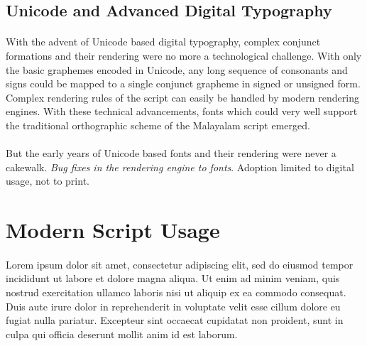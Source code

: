 \documentclass[10pt]{article}
\begin{document}
\subsection{Unicode and Advanced Digital Typography}

\paragraph{}
With the advent of Unicode based digital typography, complex conjunct formations and their rendering were no more a technological challenge. With only the basic graphemes encoded in Unicode, any long sequence of consonants and signs could be mapped to a single conjunct grapheme in signed or unsigned form. Complex rendering rules of the script can easily be handled by modern rendering engines. With these technical advancements, fonts which could very well support the traditional orthographic scheme of the Malayalam script emerged. 

\paragraph{}
But the early years of Unicode based fonts and their rendering were never a cakewalk. \textit{Bug fixes in the rendering engine to fonts}. Adoption limited to digital usage, not to print.

\section{Modern Script Usage}
\paragraph{}

Lorem ipsum dolor sit amet, consectetur adipiscing elit, sed do eiusmod tempor incididunt ut labore et dolore magna aliqua. Ut enim ad minim veniam, quis nostrud exercitation ullamco laboris nisi ut aliquip ex ea commodo consequat. Duis aute irure dolor in reprehenderit in voluptate velit esse cillum dolore eu fugiat nulla pariatur. Excepteur sint occaecat cupidatat non proident, sunt in culpa qui officia deserunt mollit anim id est laborum.
\end{document}
